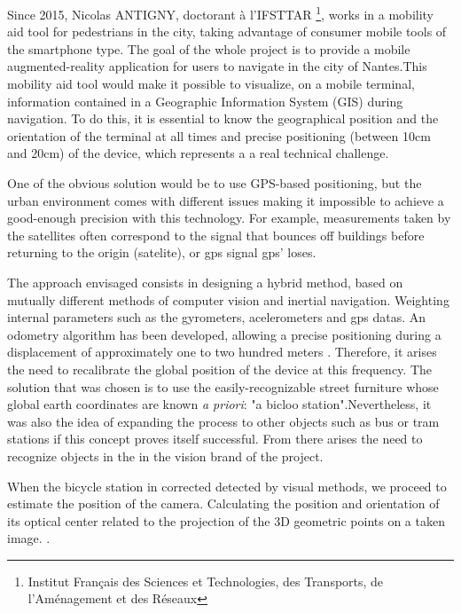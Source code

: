 \documentclass[10pt]{article}
\begin{document}
\setlength{\parindent}{0ex}Since 2015, Nicolas ANTIGNY, doctorant à l’IFSTTAR \footnote{Institut Français des Sciences et Technologies, des Transports, de l’Aménagement et des Réseaux}, works in a mobility aid tool for pedestrians in the city, taking advantage of consumer mobile tools of the smartphone type. The goal of the whole project is to provide a mobile augmented-reality application for users to navigate in the city of Nantes.This mobility aid tool would make it possible to visualize, on a mobile terminal, information contained in a Geographic Information System (GIS) during navigation. To do this, it is essential to know the geographical position and the orientation of the terminal at all times and precise positioning (between 10cm and 20cm) of the device, which represents a a real technical challenge. 


One of the obvious solution would be to use GPS-based positioning, but the urban environment comes with different issues making it impossible to achieve a good-enough precision with this technology. For example, measurements taken by the satellites often correspond to the signal that bounces off buildings before returning to the origin (satelite), or gps signal gps' loses.


The approach envisaged consists in designing a hybrid method, based on mutually different methods of computer vision and inertial navigation.  Weighting internal parameters such as the gyrometers, acelerometers and gps datas. An odometry algorithm has been developed, allowing a precise positioning during a displacement of approximately one to two hundred meters \cite{antigny2017pedestrian}. Therefore, it arises the need to recalibrate the global position of the device at this frequency. The solution that was chosen is to use the easily-recognizable street furniture whose global earth coordinates are known \textit{a priori}: "a bicloo station".Nevertheless, it was also the idea of expanding the process to other objects such as bus or tram stations if this concept proves itself successful. From there arises the need to recognize objects in the in the vision brand of the project.


When the bicycle station in corrected detected by visual methods, we proceed to estimate the position of the camera.
Calculating the position and orientation of its optical center related to the projection of the 3D geometric points on a taken image. \cite{Rapport}. \cite{antigny2017pedestrian}\\
\end{document}
